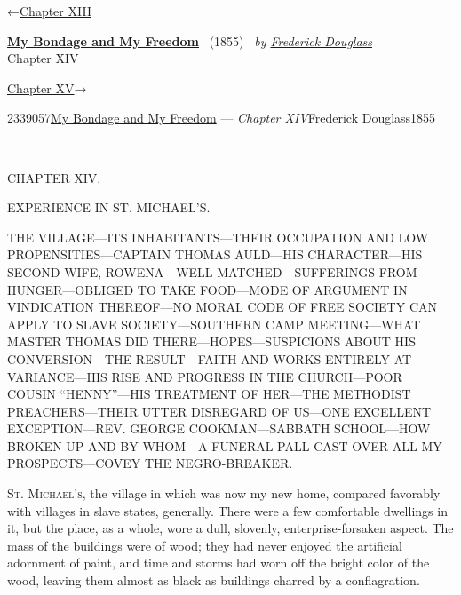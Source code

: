 \hypertarget{headerContainer}{}
\hypertarget{navigationHeader}{}
\protect\hypertarget{headerprevious}{}{←\href{/wiki/My_Bondage_and_My_Freedom_(1855)/Chapter_XIII}{Chapter
XIII}}

\textbf{\protect\hypertarget{header_title_text}{}{\href{/wiki/My_Bondage_and_My_Freedom_(1855)}{My
Bondage and My Freedom}}} ~(1855)~ \emph{by
\href{/wiki/Author:Frederick_Douglass}{\protect\hypertarget{header_author_text}{}{{Frederick
Douglass}}}}\\
\protect\hypertarget{header_section_text}{}{Chapter XIV}

\protect\hypertarget{headernext}{}{\href{/wiki/My_Bondage_and_My_Freedom_(1855)/Chapter_XV}{Chapter
XV}→}

\hypertarget{navigationNotes}{}

\hypertarget{ws-data}{}
\protect\hypertarget{ws-article-id}{}{2339057}\protect\hypertarget{ws-title}{}{\href{/wiki/My_Bondage_and_My_Freedom_(1855)}{My
Bondage and My Freedom} --- \emph{Chapter
XIV}}\protect\hypertarget{ws-author}{}{Frederick
Douglass}\protect\hypertarget{ws-year}{}{1855}

{\protect\hypertarget{185}{}{}}

~

{CHAPTER XIV.}

EXPERIENCE IN ST. MICHAEL'S.

{THE VILLAGE---ITS INHABITANTS---THEIR OCCUPATION AND LOW
PROPENSITIES---CAPTAIN THOMAS AULD---HIS CHARACTER---HIS SECOND WIFE,
ROWENA---WELL MATCHED---SUFFERINGS FROM HUNGER---OBLIGED TO TAKE
FOOD---MODE OF ARGUMENT IN VINDICATION THEREOF---NO MORAL CODE OF FREE
SOCIETY CAN APPLY TO SLAVE SOCIETY---SOUTHERN CAMP MEETING---WHAT MASTER
THOMAS DID THERE---HOPES---SUSPICIONS ABOUT HIS CONVERSION---THE
RESULT---FAITH AND WORKS ENTIRELY AT VARIANCE---HIS RISE AND PROGRESS IN
THE CHURCH---POOR COUSIN ``HENNY''---HIS TREATMENT OF HER---THE
METHODIST PREACHERS---THEIR UTTER DISREGARD OF US---ONE EXCELLENT
EXCEPTION---REV. GEORGE COOKMAN---SABBATH SCHOOL---HOW BROKEN UP AND BY
WHOM---A FUNERAL PALL CAST OVER ALL MY PROSPECTS---COVEY THE
NEGRO-BREAKER.}

\textsc{St. Michael's}, the village in which was now my new home,
compared favorably with villages in slave states, generally. There were
a few comfortable dwellings in it, but the place, as a whole, wore a
dull, slovenly, enterprise-forsaken aspect. The mass of the buildings
were of wood; they had never enjoyed the artificial adornment of paint,
and time and storms had worn off the bright color of the wood, leaving
them almost as black as buildings charred by a conflagration.

